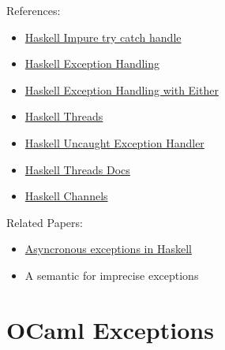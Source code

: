 \documentclass[a4paper,11pt]{article}
\theoremstyle{plain}
\theoremstyle{nonumberplain}
\begin{document}
References:

\begin{itemize}
  \item \href{https://stackoverflow.com/questions/6009384/exception-handling-in-haskell}{Haskell Impure try catch handle}
  \item \href{https://hackage-content.haskell.org/package/base-4.22.0.0/docs/Control-Exception.html}{Haskell Exception Handling}
  \item \href{https://learn-haskell.blog/06-errors_and_files/01-either.html}{Haskell Exception Handling with Either}
  \item \href{https://stackoverflow.com/questions/24998600/what-happens-to-child-threads-when-their-parent-dies-in-ghc-haskell}{Haskell Threads}
  \item \href{https://taylor.fausak.me/2021/04/03/default-exception-handler-in-haskell/}{Haskell Uncaught Exception Handler}
  \item \href{https://hackage-content.haskell.org/package/base-4.22.0.0/docs/Control-Concurrent.html}{Haskell Threads Docs}
  \item \href{https://hackage.haskell.org/package/base-4.3.0.0/docs/Control-Concurrent-Chan.html}{Haskell Channels}
\end{itemize}

Related Papers:

\begin{itemize}
  \item \href{http://research.microsoft.com/~simonpj/Papers/asynch-exns.htm}{Asyncronous exceptions in Haskell}
  \item A semantic for imprecise exceptions
\end{itemize}

\section{OCaml Exceptions}
\end{document}
